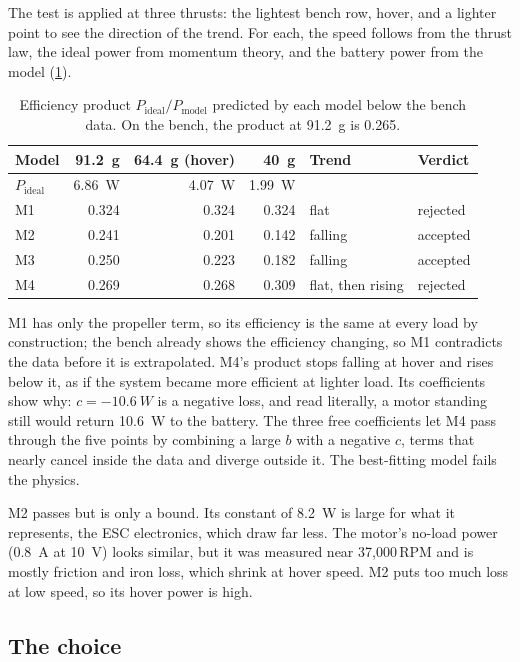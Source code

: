 The test is applied at three thrusts: the lightest bench row, hover, and a lighter point to see the direction of the trend. For each, the speed follows from the thrust law, the ideal power from momentum theory, and the battery power from the model (\cref{tab:sizing-test}).

\begin{table}[htbp]
\centering\small
\caption{Efficiency product $P_\text{ideal}/P_\text{model}$ predicted by each model below the bench data. On the bench, the product at \SI{91.2}{g} is 0.265.}\label{tab:sizing-test}
\begin{tabular}{@{}lrrrll@{}}
\toprule
Model & \SI{91.2}{g} & \SI{64.4}{g} (hover) & \SI{40}{g} & Trend & Verdict\\
\midrule
$P_\text{ideal}$ & \SI{6.86}{W} & \SI{4.07}{W} & \SI{1.99}{W} & & \\
\midrule
M1 & 0.324 & 0.324 & 0.324 & flat & rejected\\
M2 & 0.241 & 0.201 & 0.142 & falling & accepted\\
M3 & 0.250 & 0.223 & 0.182 & falling & accepted\\
M4 & 0.269 & 0.268 & 0.309 & flat, then rising & rejected\\
\bottomrule
\end{tabular}
\end{table}

M1 has only the propeller term, so its efficiency is the same at every load by construction; the bench already shows the efficiency changing, so M1 contradicts the data before it is extrapolated. M4's product stops falling at hover and rises below it, as if the system became more efficient at lighter load. Its coefficients show why: $c = \SI{-10.6}{W}$ is a negative loss, and read literally, a motor standing still would return \SI{10.6}{W} to the battery. The three free coefficients let M4 pass through the five points by combining a large $b$ with a negative $c$, terms that nearly cancel inside the data and diverge outside it. The best-fitting model fails the physics.

M2 passes but is only a bound. Its constant of \SI{8.2}{W} is large for what it represents, the ESC electronics, which draw far less. The motor's no-load power (\SI{0.8}{A} at \SI{10}{V}) looks similar, but it was measured near 37,000\,RPM and is mostly friction and iron loss, which shrink at hover speed. M2 puts too much loss at low speed, so its hover power is high.

\subsection{The choice}

